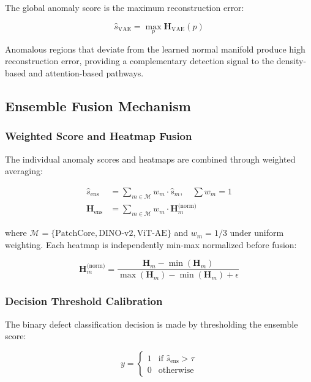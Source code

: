 \documentclass[journal]{IEEEtran}
\begin{document}
The global anomaly score is the maximum reconstruction error:

\begin{equation}
    \hat{s}_{\text{VAE}} = \max_p \mathbf{H}_{\text{VAE}}(p)
    \label{eq:vae_score}
\end{equation}

Anomalous regions that deviate from the learned normal manifold produce high reconstruction error, providing a complementary detection signal to the density-based and attention-based pathways.

\subsection{Ensemble Fusion Mechanism}
\label{sec:fusion}

\subsubsection{Weighted Score and Heatmap Fusion}

The individual anomaly scores and heatmaps are combined through weighted averaging:

\begin{align}
    \hat{s}_{\text{ens}} &= \sum_{m \in \mathcal{M}} w_m \cdot \hat{s}_m, \quad \sum w_m = 1 \\
    \mathbf{H}_{\text{ens}} &= \sum_{m \in \mathcal{M}} w_m \cdot \mathbf{H}^{\text{(norm)}}_m
    \label{eq:ensemble}
\end{align}

where $\mathcal{M} = \{\text{PatchCore}, \text{DINO-v2}, \text{ViT-AE}\}$ and $w_m = 1/3$ under uniform weighting. Each heatmap is independently min-max normalized before fusion:

\begin{equation}
    \mathbf{H}^{\text{(norm)}}_m = \frac{\mathbf{H}_m - \min(\mathbf{H}_m)}{\max(\mathbf{H}_m) - \min(\mathbf{H}_m) + \epsilon}
    \label{eq:heatmap_norm}
\end{equation}

\subsubsection{Decision Threshold Calibration}

The binary defect classification decision is made by thresholding the ensemble score:

\begin{equation}
    y = \begin{cases}
        1 & \text{if } \hat{s}_{\text{ens}} > \tau \\
        0 & \text{otherwise}
    \end{cases}
    \label{eq:decision}
\end{equation}
\end{document}
